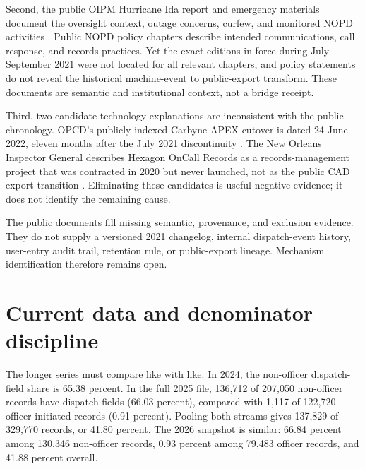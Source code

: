 \documentclass[11pt]{article}
\begin{document}
Second, the public OIPM Hurricane Ida report and emergency materials document the oversight context, outage concerns, curfew, and monitored NOPD activities \citep{OIPM2021}. Public NOPD policy chapters describe intended communications, call response, and records practices. Yet the exact editions in force during July--September 2021 were not located for all relevant chapters, and policy statements do not reveal the historical machine-event to public-export transform. These documents are semantic and institutional context, not a bridge receipt.

Third, two candidate technology explanations are inconsistent with the public chronology. OPCD's publicly indexed Carbyne APEX cutover is dated 24 June 2022, eleven months after the July 2021 discontinuity \citep{OPCDCarbyne2022}. The New Orleans Inspector General describes Hexagon OnCall Records as a records-management project that was contracted in 2020 but never launched, not as the public CAD export transition \citep{NOLAOIGHexagon2024}. Eliminating these candidates is useful negative evidence; it does not identify the remaining cause.

\begin{warningbox}[title=Institutional-evidence boundary]
The public documents fill missing semantic, provenance, and exclusion evidence. They do not supply a versioned 2021 changelog, internal dispatch-event history, user-entry audit trail, retention rule, or public-export lineage. Mechanism identification therefore remains open.
\end{warningbox}

\section{Current data and denominator discipline}

The longer series must compare like with like. In 2024, the non-officer dispatch-field share is 65.38 percent. In the full 2025 file, 136,712 of 207,050 non-officer records have dispatch fields (66.03 percent), compared with 1,117 of 122,720 officer-initiated records (0.91 percent). Pooling both streams gives 137,829 of 329,770 records, or 41.80 percent. The 2026 snapshot is similar: 66.84 percent among 130,346 non-officer records, 0.93 percent among 79,483 officer records, and 41.88 percent overall.
\end{document}
